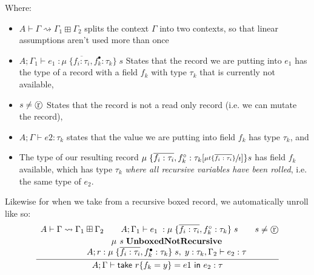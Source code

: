 Where:
\begin{itemize}
    \item $A \vdash \Gamma \rightsquigarrow \Gamma_1 \boxplus \Gamma_2$ splits the context $\Gamma$ into two contexts, so that linear assumptions aren't used 
          more than once
    \item $A;\Gamma_1 \vdash e_1\; : \mu\; \{ \overline{f_i : \tau_i}, f_k^\bullet : \tau_k \}\; s$ States that the record we are putting into $e_1$
          has the type of a record with a field $f_k$ with type $\tau_k$ that is currently not available,
    \item $s \neq \text{\textcircled{r}}   \vspace{0.5em}$ States that the record is not a read only record (i.e. we can mutate the record),
    \item $A;\Gamma \vdash e2 : \tau_k$ states that
          the value we are putting into field $f_k$ has type $\tau_k$, and
    \item The type of our resulting record $\mu\; \{ \overline{f_i : \tau_i}, f_k^\circ : \tau_k[\sfrac{ \mu t \{\overline{f_i : \tau_i} \}}{t}] \} s$
          has field $f_k$ available, which has type $\tau_k$ \textit{where all recursive variables have been rolled}, i.e. the same type of $e_2$.
\end{itemize}

Likewise for when we \textsf{take} from a recursive boxed record, 
we automatically unroll like so:
\begin{align*}
    \infer{
        A;\Gamma \vdash \textsf{take } r \{ f_k = y \} = e1 \textsf{ in } e_2 : \tau
    }{
        \begin{array}{c@{}c@{}c@{}c@{}}
            A \vdash \Gamma \rightsquigarrow \Gamma_1 \boxplus \Gamma_2 \hspace{2em}
            &
            A;\Gamma_1 \vdash e_1\; : \mu\; \{ \overline{f_i : \tau_i}, f_k^\circ : \tau_k \}\; s \hspace{2em}
            &
            s \neq \text{\textcircled{r}}   \vspace{0.2em} \\
            &
            \hspace{-5em} \mu \textit{ s } \textbf{UnboxedNotRecursive} \\
            &
            \hspace{-5em}A; r : \mu\; \{ \overline{f_i : \tau_i}, f_k^\bullet : \tau_k \}\; s
            ,\; y : \tau_k, \Gamma_2 \vdash e_2 : \tau
        \end{array}
    }
\end{align*}

